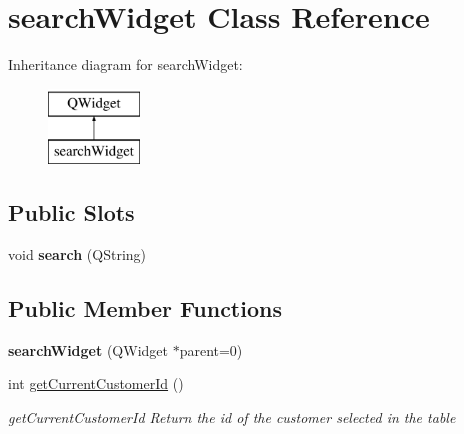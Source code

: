 \hypertarget{classsearchWidget}{\section{search\+Widget Class Reference}
\label{classsearchWidget}
}
Inheritance diagram for search\+Widget\+:\begin{figure}[H]
\begin{center}
\leavevmode
\includegraphics[height=2.000000cm]{d2/dfd/classsearchWidget}
\end{center}
\end{figure}
\subsection*{Public Slots}
\begin{DoxyCompactItemize}
\item 
\hypertarget{classsearchWidget_a01f311627fd5bdbc2886e2dbbe8d7fc7}{void {\bfseries search} (Q\+String)}\label{classsearchWidget_a01f311627fd5bdbc2886e2dbbe8d7fc7}

\end{DoxyCompactItemize}
\subsection*{Public Member Functions}
\begin{DoxyCompactItemize}
\item 
\hypertarget{classsearchWidget_a0c712bf4f3c2105319645ce97e23eba9}{{\bfseries search\+Widget} (Q\+Widget $\ast$parent=0)}\label{classsearchWidget_a0c712bf4f3c2105319645ce97e23eba9}

\item 
int \hyperlink{classsearchWidget_ac74ae97eb8c147c89edc3dec3decf174}{get\+Current\+Customer\+Id} ()
\begin{DoxyCompactList}\small\item\em get\+Current\+Customer\+Id Return the id of the customer selected in the table \end{DoxyCompactList}\end{DoxyCompactItemize}



